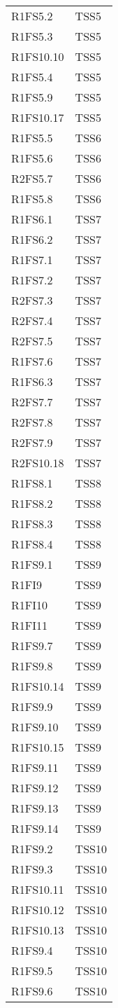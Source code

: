 {\begin{longtable}{C{4cm} C{4cm}}
R1FS5.2 & TSS5 \\
R1FS5.3 & TSS5 \\
R1FS10.10 & TSS5 \\
R1FS5.4 & TSS5 \\
R1FS5.9 & TSS5 \\
R1FS10.17 & TSS5 \\
R1FS5.5 & TSS6 \\
R1FS5.6 & TSS6 \\
R2FS5.7 & TSS6 \\
R1FS5.8 & TSS6 \\
R1FS6.1 & TSS7 \\
R1FS6.2 & TSS7 \\
R1FS7.1 & TSS7 \\
R1FS7.2 & TSS7 \\
R2FS7.3 & TSS7 \\
R2FS7.4 & TSS7 \\
R2FS7.5 & TSS7 \\
R1FS7.6 & TSS7 \\
R1FS6.3 & TSS7 \\
R2FS7.7 & TSS7 \\
R2FS7.8 & TSS7 \\
R2FS7.9 & TSS7 \\
R2FS10.18 & TSS7 \\
R1FS8.1 & TSS8 \\
R1FS8.2 & TSS8 \\
R1FS8.3 & TSS8 \\
R1FS8.4 & TSS8 \\
R1FS9.1 & TSS9 \\
R1FI9 & TSS9 \\
R1FI10 & TSS9 \\
R1FI11 & TSS9 \\
R1FS9.7 & TSS9 \\
R1FS9.8 & TSS9 \\
R1FS10.14 & TSS9 \\
R1FS9.9 & TSS9 \\
R1FS9.10 & TSS9 \\
R1FS10.15 & TSS9 \\
R1FS9.11 & TSS9 \\
R1FS9.12 & TSS9 \\
R1FS9.13 & TSS9 \\
R1FS9.14 & TSS9 \\
R1FS9.2 & TSS10 \\
R1FS9.3 & TSS10 \\
R1FS10.11 & TSS10 \\
R1FS10.12 & TSS10 \\
R1FS10.13 & TSS10 \\
R1FS9.4 & TSS10 \\
R1FS9.5 & TSS10 \\
R1FS9.6 & TSS10 \\

\end{longtable}
}






















